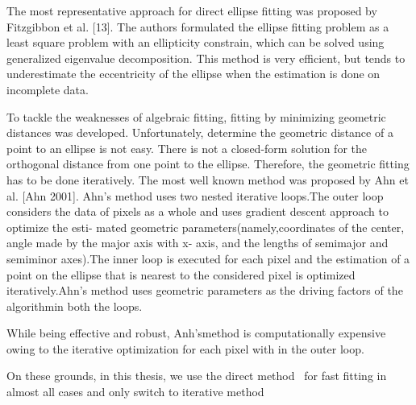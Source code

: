 \documentclass[a4paper]{report}
\begin{document}
The most representative approach for direct ellipse fitting was proposed by Fitzgibbon et al. [13]. The authors formulated the ellipse fitting problem as a least square problem with an ellipticity constrain, which can be solved using generalized eigenvalue decomposition. This method is very efficient, but tends to underestimate the eccentricity of the ellipse when the estimation is
done on incomplete data.


To tackle the weaknesses of algebraic fitting, fitting by minimizing geometric distances was developed. Unfortunately, determine the geometric distance of a point to an ellipse is not easy. There is not a closed-form solution for the orthogonal distance from one point to the ellipse. Therefore, the geometric fitting has to be done iteratively. 
The most well known method was proposed by Ahn et al. [Ahn 2001].
Ahn’s method uses two nested
iterative loops.The outer loop considers the data of pixels as a
whole and uses gradient descent approach to optimize the esti-
mated geometric parameters(namely,coordinates of the center,
angle made by the major axis with x- axis, and the lengths of
semimajor and semiminor axes).The inner loop is executed for each
pixel and the estimation of a point on the ellipse that is nearest to
the considered pixel is optimized iteratively.Ahn’s method uses
geometric parameters as the driving factors of the algorithmin both
the loops.

While being effective and
robust, Anh’smethod is computationally expensive owing to the iterative optimization for each pixel with in the outer loop.
%


On these grounds, in this thesis, we use the direct method~\cite{fitzgibbon1999direct}  for fast fitting in almost all cases and only switch to iterative method  


 

\end{document}
